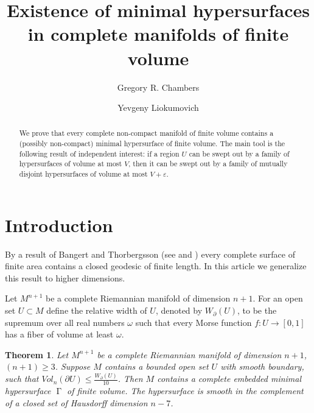 \documentclass[12pt]{amsart}
\title[Existence of minimal hypersurface]{Existence of minimal hypersurfaces
in complete manifolds of finite volume}
\author{Gregory R. Chambers}
\author{Yevgeny Liokumovich}
\newtheorem{theorem}{Theorem}[section]
\DeclareMathOperator{\Hn}{\mathcal{H}^n}
\DeclareMathOperator{\G}{\Gamma}
\theoremstyle{definition}
\begin{document}
\maketitle

\begin{abstract}
We prove that every complete non-compact
manifold of finite volume
contains a (possibly non-compact)
minimal hypersurface of finite volume.
The  main tool is the following result of 
independent interest: if a region $U$ can be swept out by a family of hypersurfaces of volume
at most $V$, then it can be swept out by a family of 
mutually disjoint
hypersurfaces of volume at most $V + \varepsilon$.
\end{abstract}

\section{Introduction}
\label{sec:Introduction}

By a result of Bangert and Thorbergsson 
(see \cite{Th} and \cite{Ba}) 
every complete
surface of finite area contains a closed
geodesic of finite length.
In this article we generalize this result
to higher dimensions.

Let $M^{n+1}$ be a complete Riemannian
manifold of dimension $n+1$.
For an open set $U \subset M$ define
the relative width of $U$, denoted by $W_{\partial}(U)$, 
to be the supremum over all real numbers $\omega$
such that every Morse function
$f:U \rightarrow [0,1]$
has a fiber of volume at least $\omega$.


\begin{theorem} \label{main}
Let $M^{n+1}$ be a complete Riemannian
manifold of dimension $n+1$, $(n+1) \geq 3$.
Suppose $M$ contains a bounded open set $U$
with smooth boundary, such that
$Vol_n(\partial U)\leq \frac{W_{\partial}(U)}{10}$.
Then $M$ contains a complete
embedded minimal hypersurface $\G$ of finite volume.
The hypersurface is smooth
in the complement of a closed set of Hausdorff dimension $n-7$.
\end{theorem}
\end{document}
